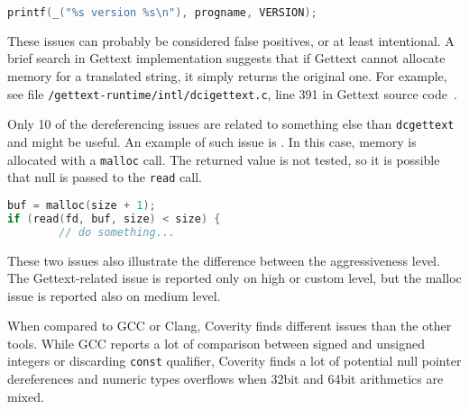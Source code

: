 \begin{lstlisting}[frame=none, basicstyle=\footnotesize\ttfamily,
language=C, numbers=none, numberstyle=\tiny\color{black},caption=
{{\tt xfs\_mkfs.c:1713}: Line which is reportedly dereferencing a potentially
null pointer with Gettext},
label={lst:results:dereferencePrintf}]
printf(_("%s version %s\n"), progname, VERSION);
\end{lstlisting}

These issues can probably be considered false positives, or at least
intentional. A brief search in Gettext implementation suggests that if Gettext
cannot allocate memory for a translated string, it simply returns the original
one. For example, see file {\tt /gettext-runtime/intl/dcigettext.c}, line 391
in Gettext source code~\cite{GettextGit}.

Only 10 of the dereferencing issues are related to something else
than {\tt dcgettext} and might be useful. An example of such issue is
.  In this case, memory is allocated with a
{\tt malloc} call. The returned value is not tested, so it is possible that
null is passed to the {\tt read} call.

\begin{lstlisting}[frame=none, basicstyle=\footnotesize\ttfamily,
language=C, numbers=none, numberstyle=\tiny\color{black},caption=
{{\tt proto.c:66}: Line which is reportedly dereferencing a potentially null
pointer - no malloc check.},
label={lst:results:dereferenceBuf}]
buf = malloc(size + 1);
if (read(fd, buf, size) < size) {
        // do something...
\end{lstlisting}

These two issues also illustrate the difference between the aggressiveness
level. The Gettext-related issue is reported only on high or custom level, but
the malloc issue is reported also on medium level.

When compared to GCC or Clang, Coverity finds different issues than the other
tools. While GCC reports a lot of comparison between signed and unsigned
integers or discarding {\tt const} qualifier, Coverity finds a lot of potential
null pointer dereferences and numeric types overflows when 32bit and 64bit
arithmetics are mixed.


